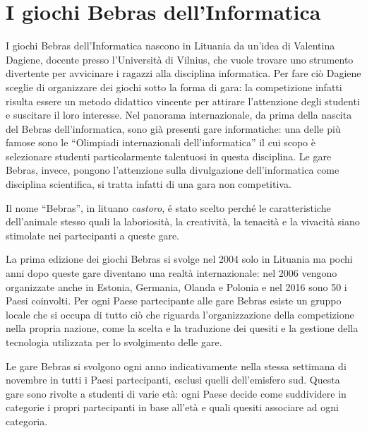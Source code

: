 \documentclass[12pt]{report}
\begin{document}
\chapter{I giochi Bebras dell'Informatica}
\label{cap1}
I giochi Bebras dell'Informatica nascono in Lituania da un'idea di Valentina Dagiene, docente presso l'Università di Vilnius, che vuole trovare uno strumento divertente per avvicinare i ragazzi alla disciplina informatica. Per fare ciò Dagiene sceglie di organizzare dei giochi sotto la forma di gara: la competizione infatti risulta essere un metodo didattico vincente per attirare l'attenzione degli studenti e suscitare il loro interesse. Nel panorama internazionale, da prima della nascita del Bebras dell'informatica, sono già presenti gare informatiche: una delle più famose sono le ``Olimpiadi internazionali dell'informatica'' il cui scopo è selezionare studenti particolarmente talentuosi in questa disciplina. Le gare Bebras, invece, pongono l'attenzione sulla divulgazione dell'informatica come disciplina scientifica, si tratta infatti di una gara non competitiva.

Il nome ``Bebras'', in lituano \textit{castoro}, é stato scelto perché le caratteristiche dell'animale stesso quali la laboriosità, la creatività, la tenacità e la vivacità siano stimolate nei partecipanti a queste gare.

La prima edizione dei giochi Bebras si svolge nel 2004 solo in Lituania ma pochi anni dopo queste gare diventano una realtà internazionale: nel 2006 vengono organizzate anche in Estonia, Germania, Olanda e Polonia e nel 2016 sono 50 i Paesi coinvolti.
Per ogni Paese partecipante alle gare Bebras esiste un gruppo locale che si occupa di tutto ciò che riguarda l'organizzazione della competizione nella propria nazione, come la scelta e la traduzione dei quesiti e la gestione della tecnologia utilizzata per lo svolgimento delle gare.

Le gare Bebras si svolgono ogni anno indicativamente nella stessa settimana di novembre in tutti i Paesi partecipanti, esclusi quelli dell'emisfero sud. 
Questa gare sono rivolte a studenti di varie età: ogni Paese decide come suddividere in categorie i propri partecipanti in base all'età e quali quesiti associare ad ogni categoria.
\end{document}
